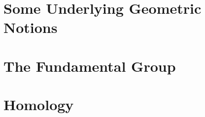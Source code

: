 

\chapter{Some Underlying Geometric Notions}
\label{chap:geometric-notions}


\chapter{The Fundamental Group}
\label{chap:fundamental-group}


\chapter{Homology}
\label{chap:homology}


